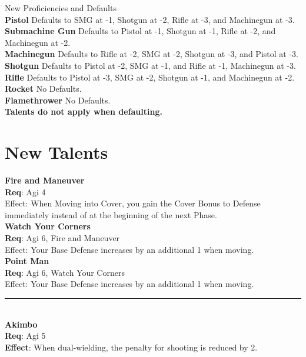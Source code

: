 \documentclass[a4paper, twocolumn, openany]{book}
\newlength{\indentlen}
\newcommand{\tabto}[1]{\setlength{\leftskip}{#1\indentlen}}
\begin{document}
{{\large New Proficiencies and Defaults\\}
\noindent
{\bfseries Pistol} Defaults to SMG at -1, Shotgun at -2, Rifle at -3, and Machinegun at -3.\\
{\bfseries Submachine Gun} Defaults to Pistol at -1, Shotgun at -1, Rifle at -2, and Machinegun at -2.\\
{\bfseries Machinegun} Defaults to Rifle at -2, SMG at -2, Shotgun at -3, and Pistol at -3.\\
{\bfseries Shotgun} Defaults to Pistol at -2, SMG at -1, and Rifle at -1, Machinegun at -3.\\
{\bfseries Rifle} Defaults to Pistol at -3, SMG at -2, Shotgun at -1, and Machinegun at -2.\\
{\bfseries Rocket} No Defaults.\\
{\bfseries Flamethrower} No Defaults.\\

{\bfseries Talents do not apply when defaulting.\\}

\newpage
\section{New Talents}
{\bfseries\hspace*{\parindent} Fire and Maneuver}\\
{\bfseries Req}:  Agi 4\\
Effect: When Moving into Cover, you gain the Cover Bonus to Defense immediately instead of
at the beginning of the next Phase.\\

	\tabto{1}
	{\bfseries Watch Your Corners}\\
	{\bfseries Req}: Agi 6, Fire and Maneuver\\
	Effect: Your Base Defense increases by an additional 1 when moving.\\

		\tabto{2}
		{\bfseries Point Man}\\
		{\bfseries Req}:  Agi 6, Watch Your Corners\\
		Effect: Your Base Defense increases by an additional 1 when moving.\\ \hrule\ \\

\tabto{0} %
{\bfseries Akimbo}\\
{\bfseries Req}: Agi 5\\
{\bfseries Effect}: When dual-wielding, the penalty for shooting is reduced by 2.\\

}
\end{document}
